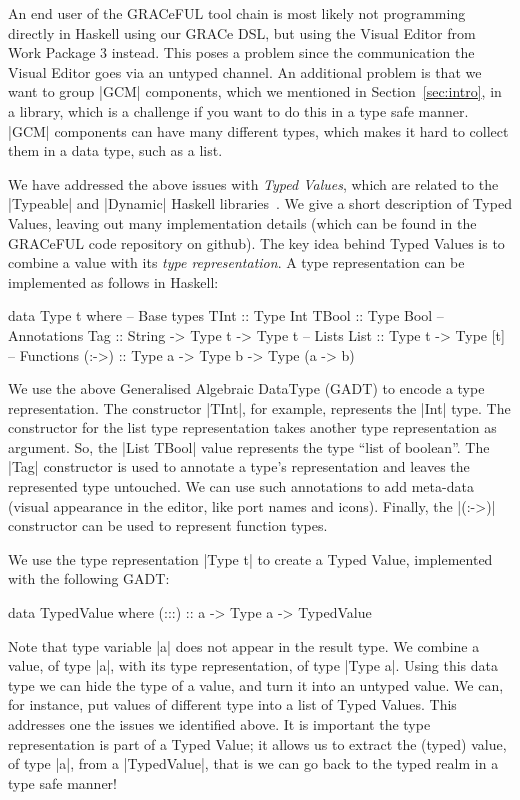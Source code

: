 \documentclass{article}
\begin{document}
An end user of the GRACeFUL tool chain is most likely not programming
directly in Haskell using our GRACe DSL, but using the Visual Editor
from Work Package 3 instead.
%
This poses a problem since the communication the Visual Editor goes
via an untyped channel.
%
An additional problem is that we want to group |GCM| components, which
we mentioned in Section~\ref{sec:intro}, in a library, which is a
challenge if you want to do this in a type safe manner.
%
|GCM| components can have many different types, which makes it hard to
collect them in a data type, such as a list.

We have addressed the above issues with \emph{Typed Values}, which are
related to the |Typeable| and |Dynamic| Haskell
libraries~\cite{DataDynamic}.
%
We give a short description of Typed Values, leaving out many
implementation details (which can be found in the GRACeFUL code
repository on github).
%
The key idea behind Typed Values is to combine a value with its
\emph{type representation}.
%
A type representation can be implemented as follows in Haskell:
%
\begin{haskellcode}
data Type t where
  -- Base types
  TInt   :: Type Int
  TBool  :: Type Bool
  -- Annotations
  Tag   :: String -> Type t -> Type t
  -- Lists
  List  :: Type t -> Type [t]
  -- Functions
  (:->) :: Type a -> Type b -> Type (a -> b)
\end{haskellcode}
%
We use the above Generalised Algebraic DataType (GADT) to encode a
type representation.
%
The constructor |TInt|, for example, represents the |Int| type.
%
The constructor for the list type representation takes another type
representation as argument.
%
So, the |List TBool| value represents the type ``list of boolean''.
%
The |Tag| constructor is used to annotate a type's representation and
leaves the represented type untouched.
%
We can use such annotations to add meta-data (visual appearance in the
editor, like port names and icons).
%
Finally, the |(:->)| constructor can be used to represent function
types.

We use the type representation |Type t| to create a Typed Value,
implemented with the following GADT:
%
\begin{haskellcode}
data TypedValue where
  (:::) :: a -> Type a -> TypedValue
\end{haskellcode}
%
Note that type variable |a| does not appear in the result type.
%
We combine a value, of type |a|, with its type representation, of type
|Type a|.
%
Using this data type we can hide the type of a value, and turn it into
an untyped value.
%
We can, for instance, put values of different type into a list of
Typed Values.
%
This addresses one the issues we identified above.
%
It is important the type representation is part of a Typed Value;
%
it allows us to extract the (typed) value, of type |a|, from a
|TypedValue|, that is we can go back to the typed realm in a type safe
manner!
\end{document}
